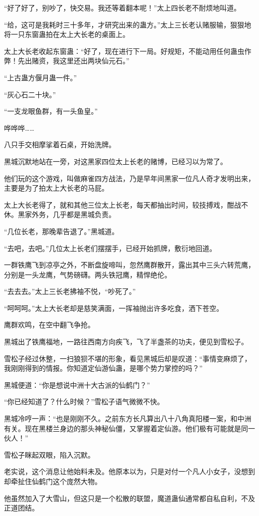 \begin{this_body}
“好了好了，别吵了，快交易。我还等着翻本呢！”太上四长老不耐烦地叫道。

“给，这可是我耗时三十多年，才研究出来的蛊方。”太上三长老认赌服输，狠狠地将一只东窗蛊拍在太上大长老的桌面上。

太上大长老收起东窗蛊：“好了，现在进行下一局。好规矩，不能动用任何蛊虫作弊！先出赌资，我这里还出两块仙元石。”

“上古蛊方偃月蛊一件。”

“灰心石二十块。”

“一支龙眼鱼群，有一头鱼皇。”

哗哗哗……

八只手交相摩挲着石桌，开始洗牌。

黑城沉默地站在一旁，对这黑家四位太上长老的赌博，已经习以为常了。

他们玩的这个游戏，叫做麻雀四方战法，乃是早年间黑家一位凡人奇才发明出来，主要是为了拍太上大长老的马屁。

太上大长老得了，就和其他三位太上长老，每天都抽出时间，较技搏戏，酣战不休。黑家外务，几乎都是黑城负责。

“几位长老，那晚辈告退了。”黑城道。

“去吧，去吧。”几位太上长老们摆摆手，已经开始抓牌，敷衍地回道。

一群铁鹰飞到凉亭之外，不断盘旋啼叫，忽然鹰群散开，露出其中三头六转荒鹰，分别是一头龙鹰，气势磅礴。两头铁冠鹰，精悍绝伦。

“去去去。”太上三长老拂袖不悦，“吵死了。”

“呵呵呵。”太上大长老却是慈笑满面，一挥袖抛出许多吃食，洒下苍空。

鹰群欢鸣，在空中翻飞争抢。

黑城出了铁鹰福地，一路往西南方向疾飞，飞了半盏茶的功夫，便见到雪松子。

雪松子经过休整，一扫狼狈不堪的形象，看见黑城后却是叹道：“事情变麻烦了，我刚刚得到的情报。你知道定仙游仙蛊，是哪个势力掌控的吗？”

黑城便道：“你是想说中洲十大古派的仙鹤门？”

“你已经知道了？什么时候？”雪松子语气微微不快。

黑城冷哼一声：“也是刚刚不久。之前东方长凡算出八十八角真阳楼一案，和中洲有关。现在黑楼兰身边的那头神秘仙僵，又掌握着定仙游。他们极有可能就是同一伙人！”

雪松子眯起双眼，陷入沉默。

老实说，这个消息让他始料未及。他原本以为，只是对付一个凡人小女子，没想到却牵扯住仙鹤门这个庞然大物。

他虽然加入了大雪山，但这只是一个松散的联盟，魔道蛊仙通常都自私自利，不及正道团结。


\end{this_body}
